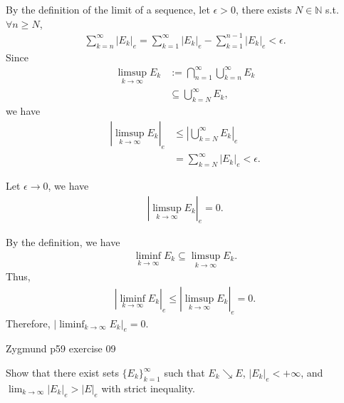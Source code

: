 \documentclass[UTF8,a4paper,10pt]{article}
\begin{document}
  \begin{solution}

  By the definition of the limit of a sequence, let \(\epsilon>0\), there exists \(N\in \mathbb{N}\) s.t. \(\forall n\geq N\),
  \begin{equation*}
    \begin{aligned}
      \sum_{k=n}^{\infty}|E_k|_e = \sum_{k=1}^{\infty}|E_k|_e - \sum_{k=1}^{n-1}|E_k|_e < \epsilon.
    \end{aligned}
  \end{equation*}
Since
  \begin{equation*}
    \begin{aligned}
      \limsup_{k\to\infty}E_k &:= \bigcap_{n=1}^{\infty}  \bigcup_{k=n}^{\infty} E_k\\
      &\subseteq \bigcup_{k=N}^{\infty} E_k,
    \end{aligned}
  \end{equation*}
  we have
  \begin{equation*}
    \begin{aligned}
      |\limsup_{k\to\infty}E_k|_e&\leq |\bigcup_{k=N}^{\infty} E_k|_e\\
      &=\sum_{k=N}^{\infty}|E_k|_e <\epsilon.
    \end{aligned}
  \end{equation*}

  Let \(\epsilon\to 0\), we have
  \begin{equation*}
    \begin{aligned}
      |\limsup_{k\to\infty}E_k|_e=0.
    \end{aligned}
  \end{equation*}

  \dotfill

  By the definition, we have
  \begin{equation*}
    \begin{aligned}
      \liminf_{k\to\infty}E_k \subseteq \limsup_{k\to\infty}E_k.
    \end{aligned}
  \end{equation*}
Thus, 
\begin{equation*}
  \begin{aligned}
    |\liminf_{k\to\infty}E_k|_e \leq |\limsup_{k\to\infty}E_k|_e = 0.
  \end{aligned}
\end{equation*}
Therefore, \( |\liminf_{k\to\infty}E_k|_e = 0\).


  \end{solution}


  \begin{Problem}[]{Zygmund p59 exercise 09}

    Show that there exist sets \(\{E_k\}_{k=1}^{\infty}\) such that \(E_k \searrow  E\), \(|E_k|_e < +\infty\), and \(\lim_{k\to\infty} |E_k|_e > |E|_e\) with strict inequality.
  \end{Problem}
\end{document}
